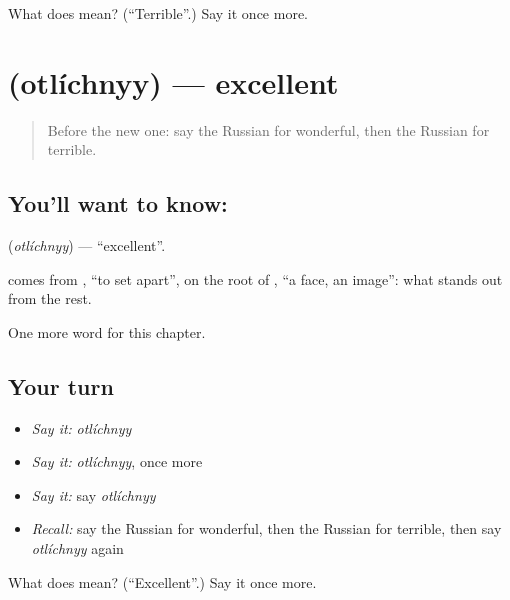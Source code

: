 \begin{tcolorbox}[breakable,colback=teal!4,colframe=teal!35!black,title={Before you move on}]
What does  mean? (\textquotedblleft{}Terrible\textquotedblright{}.) Say it once more.
\end{tcolorbox}
\section[\texorpdfstring{\ru{отличный} (otlíchnyy)}{отличный (otlíchnyy)}]{ (otlíchnyy) — excellent}

\label{lesson:RU-C245-otlichnyy}



\begin{quote}
Before the new one: say the Russian for wonderful, then the Russian for terrible.
\end{quote}

\subsection*{You'll want to know: }
\textbf{} (\emph{otlíchnyy}) — \textquotedblleft{}excellent\textquotedblright{}.

\begin{cousinweb}
\textbf{} comes from \emph{}, \textquotedblleft{}to set apart\textquotedblright{}, on the root of \emph{}, \textquotedblleft{}a face, an image\textquotedblright{}: what stands out from the rest.
\end{cousinweb}

\begin{grammarlens}[title={What you've built}]
One more word for this chapter.
\end{grammarlens}

\subsection*{Your turn}
\begin{itemize}
\raggedright
  \item \emph{Say it:} \emph{otlíchnyy}
  \item \emph{Say it:} \emph{otlíchnyy}, once more
  \item \emph{Say it:} say \emph{otlíchnyy}
  \item \emph{Recall:} say the Russian for wonderful, then the Russian for terrible, then say \emph{otlíchnyy} again
\end{itemize}

\begin{tcolorbox}[breakable,colback=teal!4,colframe=teal!35!black,title={Before you move on}]
What does  mean? (\textquotedblleft{}Excellent\textquotedblright{}.) Say it once more.
\end{tcolorbox}
